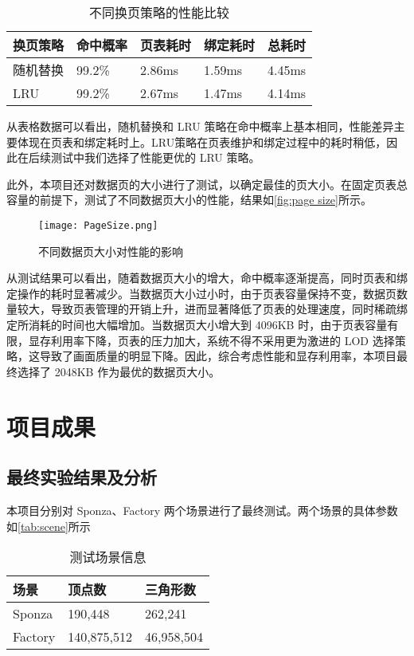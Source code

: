 \begin{table}[!htb]
    \caption{\label{tab:swap page}不同换页策略的性能比较}
    \begin{tabularx}{\linewidth}{|X<{\centering}|X<{\centering}|X<{\centering}|X<{\centering}|X<{\centering}|}
        \hline
        换页策略 & 命中概率 & 页表耗时 & 绑定耗时 & 总耗时 \\ \hline
        随机替换 & 99.2\% & 2.86ms & 1.59ms & 4.45ms \\ \hline
        LRU & 99.2\% & 2.67ms & 1.47ms & 4.14ms \\ \hline
    \end{tabularx}
\end{table}

从表格数据可以看出，随机替换和 LRU 策略在命中概率上基本相同，性能差异主要体现在页表和绑定耗时上。LRU策略在页表维护和绑定过程中的耗时稍低，因此在后续测试中我们选择了性能更优的 LRU 策略。

此外，本项目还对数据页的大小进行了测试，以确定最佳的页大小。在固定页表总容量的前提下，测试了不同数据页大小的性能，结果如\autoref{fig:page size}所示。

\begin{figure}[ht]
    \centering
    \texttt{[image: PageSize.png]}
    \caption{\label{fig:page size}不同数据页大小对性能的影响}
\end{figure}

从测试结果可以看出，随着数据页大小的增大，命中概率逐渐提高，同时页表和绑定操作的耗时显著减少。当数据页大小过小时，由于页表容量保持不变，数据页数量较大，导致页表管理的开销上升，进而显著降低了页表的处理速度，同时稀疏绑定所消耗的时间也大幅增加。当数据页大小增大到 4096KB 时，由于页表容量有限，显存利用率下降，页表的压力加大，系统不得不采用更为激进的 LOD 选择策略，这导致了画面质量的明显下降。因此，综合考虑性能和显存利用率，本项目最终选择了 2048KB 作为最优的数据页大小。

\section{项目成果}

\subsection{最终实验结果及分析}

本项目分别对 Sponza、Factory 两个场景进行了最终测试。两个场景的具体参数如\autoref{tab:scene}所示

\begin{table}[!htb]
    \caption{\label{tab:scene}测试场景信息}
    \begin{tabularx}{\linewidth}{|X<{\centering}|X<{\centering}|X<{\centering}|}
        \hline
        场景 & 顶点数 & 三角形数 \\ \hline
        Sponza & 190,448 & 262,241 \\ \hline
        Factory & 140,875,512 & 46,958,504 \\ \hline
    \end{tabularx}
\end{table}

